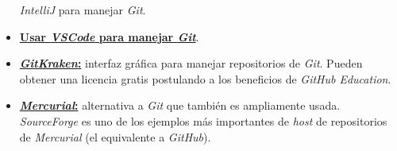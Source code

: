 \begin{itemize}
{{        \textit{IntelliJ} para manejar \textit{Git}}}.
      \item  \href{https://code.visualstudio.com/docs/editor/versioncontrol}{
        \textbf{Usar \textit{VSCode} para manejar \textit{Git}}}.
      \item \href{https://www.gitkraken.com}{\textbf{\textit{GitKraken}:}} interfaz 
        gráfica para manejar repositorios de \textit{Git}.
        Pueden obtener una licencia gratis postulando a los beneficios de 
        \textit{GitHub Education}.
      \item \href{https://www.mercurial-scm.org}{\textbf{\textit{Mercurial}:}} 
        alternativa a \textit{Git} que también es ampliamente usada.
        \textit{SourceForge} es uno de los ejemplos más importantes de \textit{host} 
        de repositorios de \textit{Mercurial} (el equivalente a \textit{GitHub}).
    \end{itemize}
  \nocite{*}
  \printbibliography[keyword=git]
%
